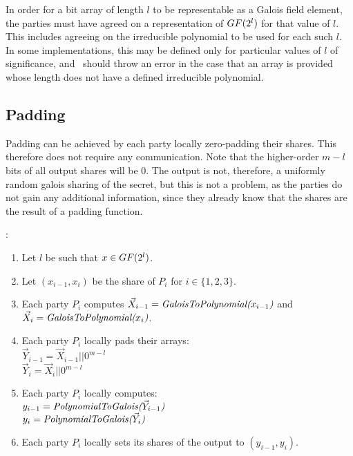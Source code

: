 In order for a bit array of length $l$ to be representable
as a Galois field element, the parties must have agreed on a 
representation of $GF(2^l)$ for that value of $l$.
This includes agreeing on the irreducible polynomial to be used 
for each such $l$.
In some implementations, this may be defined only for particular values
of $l$ of significance,
and \BoolArrToGal{}~should throw an error in the case that 
an array is provided whose length does not have a defined irreducible polynomial.

\subsection{Padding}

Padding can be achieved by each party locally zero-padding their shares.
This therefore does not require any communication.
Note that the higher-order $m-l$ bits of all output shares will be 0.
The output is not, therefore, a uniformly random galois sharing of the secret,
but this is not a problem, as the parties do not gain any additional information,
since they already know that the shares are the result of a padding function.

\begin{protocol}[Padding]
	:
	\begin{enumerate}
		\item Let $l$ be such that $x \in GF(2^l)$.
		\item Let $(x_{i-1}, x_i)$ be the share of $P_i$ for $i \in \{1, 2, 3\}$.
		\item Each party $P_i$ computes 
			$\vec{X}_{i-1} = \textit{GaloisToPolynomial(}x_{i-1}\textit{)}$
			and $\vec{X}_i = \textit{GaloisToPolynomial(}x_i\textit{)}$.
		\item Each party $P_i$ locally pads their arrays:\\
			$\vec{Y}_{i-1} = \vec{X}_{i-1} || 0^{m-l}$\\
			$\vec{Y}_i = \vec{X}_i || 0^{m-l}$
		\item Each party $P_i$ locally computes:\\
			$y_{i-1} = \textit{PolynomialToGalois(}\vec{Y}_{i-1}\textit{)}$\\
			$y_i = \textit{PolynomialToGalois(}\vec{Y}_i\textit{)}$
		\item Each party $P_i$ locally sets its shares of the output to 
			$(y_{i-1}, y_i)$.
	\end{enumerate}
\end{protocol}
